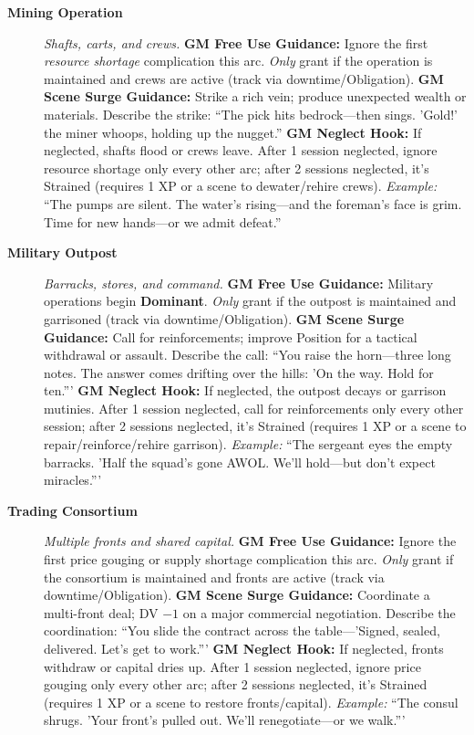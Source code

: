 \begin{description}
  \item[\textbf{Mining Operation}]   
        \emph{Shafts, carts, and crews.}  
        \textbf{GM Free Use Guidance:} Ignore the first \emph{resource shortage} complication this arc. \emph{Only} grant if the operation is maintained and crews are active (track via downtime/Obligation).  
        \textbf{GM Scene Surge Guidance:} Strike a rich vein; produce unexpected wealth or materials. Describe the strike: ``The pick hits bedrock---then sings. 'Gold!' the miner whoops, holding up the nugget.''  
        \textbf{GM Neglect Hook:} If neglected, shafts flood or crews leave. After 1 session neglected, ignore resource shortage only every other arc; after 2 sessions neglected, it's Strained (requires 1 XP or a scene to dewater/rehire crews).  
        \textit{Example:} ``The pumps are silent. The water's rising---and the foreman's face is grim. Time for new hands---or we admit defeat.''  

  \item[\textbf{Military Outpost}]   
        \emph{Barracks, stores, and command.}  
        \textbf{GM Free Use Guidance:} Military operations begin \textbf{Dominant}. \emph{Only} grant if the outpost is maintained and garrisoned (track via downtime/Obligation).  
        \textbf{GM Scene Surge Guidance:} Call for reinforcements; improve Position for a tactical withdrawal or assault. Describe the call: ``You raise the horn---three long notes. The answer comes drifting over the hills: 'On the way. Hold for ten.'''  
        \textbf{GM Neglect Hook:} If neglected, the outpost decays or garrison mutinies. After 1 session neglected, call for reinforcements only every other session; after 2 sessions neglected, it's Strained (requires 1 XP or a scene to repair/reinforce/rehire garrison).  
        \textit{Example:} ``The sergeant eyes the empty barracks. 'Half the squad's gone AWOL. We'll hold---but don't expect miracles.'''  

  \item[\textbf{Trading Consortium}]   
        \emph{Multiple fronts and shared capital.}  
        \textbf{GM Free Use Guidance:} Ignore the first price gouging or supply shortage complication this arc. \emph{Only} grant if the consortium is maintained and fronts are active (track via downtime/Obligation).  
        \textbf{GM Scene Surge Guidance:} Coordinate a multi-front deal; DV $-1$ on a major commercial negotiation. Describe the coordination: ``You slide the contract across the table---'Signed, sealed, delivered. Let's get to work.'''  
        \textbf{GM Neglect Hook:} If neglected, fronts withdraw or capital dries up. After 1 session neglected, ignore price gouging only every other arc; after 2 sessions neglected, it's Strained (requires 1 XP or a scene to restore fronts/capital).  
        \textit{Example:} ``The consul shrugs. 'Your front's pulled out. We'll renegotiate---or we walk.'''  


\end{description}
